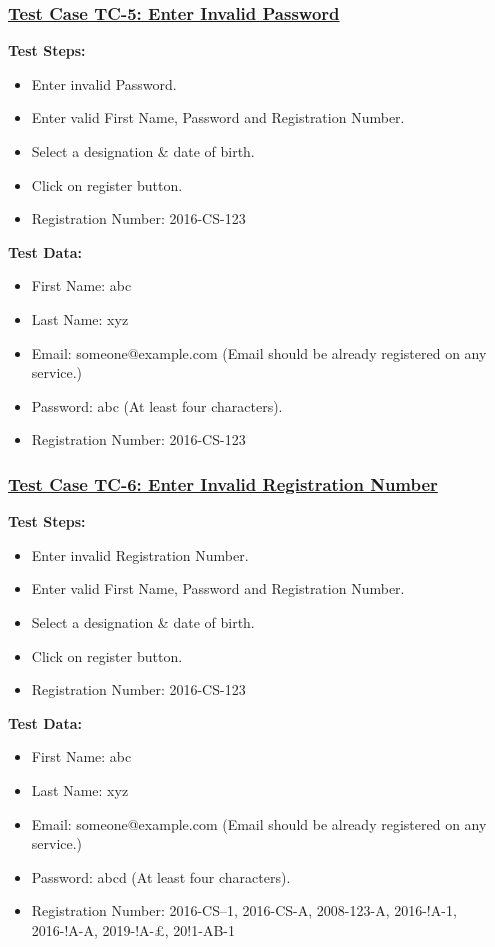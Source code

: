 \subsubsection{\underline{Test Case TC-5: Enter Invalid Password}}
\textbf{Test Steps:}
\begin{itemize}

\item Enter invalid Password.
\item Enter valid First Name, Password and Registration Number.
\item Select a designation \& date of birth.
\item Click on register button.
\item Registration Number: 2016-CS-123

\end{itemize}

\textbf{Test Data:}
\begin{itemize}

\item First Name: abc
\item Last Name: xyz
\item Email: someone@example.com (Email should be already registered on any service.)
\item Password: abc (At least four characters).
\item Registration Number: 2016-CS-123

\end{itemize}

\subsubsection{\underline{Test Case TC-6: Enter Invalid Registration Number}}
\textbf{Test Steps:}
\begin{itemize}

\item Enter invalid Registration Number.
\item Enter valid First Name, Password and Registration Number.
\item Select a designation \& date of birth.
\item Click on register button.
\item Registration Number: 2016-CS-123

\end{itemize}

\textbf{Test Data:}
\begin{itemize}

\item First Name: abc
\item Last Name: xyz
\item Email: someone@example.com (Email should be already registered on any service.)
\item Password: abcd (At least four characters).
\item Registration Number: 2016-CS--1, 2016-CS-A, 2008-123-A, 2016-!A-1, 2016-!A-A, 2019-!A-£, 20!1-AB-1

\end{itemize}


